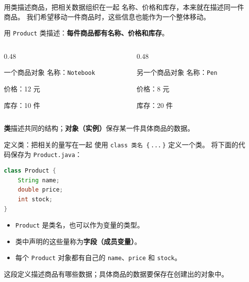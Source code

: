 \documentclass[aspectratio=169]{beamer}
\begin{document}
\begin{frame}{用类描述商品，把相关数据组织在一起}
  名称、价格和库存，本来就在描述同一件商品。
  我们希望移动一件商品时，这些信息也能\alert{作为一个整体}移动。
  \par\bigskip
  用 \texttt{Product} 类描述：\textbf{每件商品都有名称、价格和库存}。
  \par\medskip
  \begin{columns}[T,onlytextwidth]
    \begin{column}{0.48\textwidth}
      \begin{block}{一个商品对象}
        名称：\texttt{Notebook}\par
        价格：12 元\par
        库存：10 件
      \end{block}
    \end{column}
    \begin{column}{0.48\textwidth}
      \begin{block}{另一个商品对象}
        名称：\texttt{Pen}\par
        价格：8 元\par
        库存：20 件
      \end{block}
    \end{column}
  \end{columns}
  \bigskip
  \textbf{类}描述共同的结构；\textbf{对象（实例）}保存某一件具体商品的数据。
\end{frame}

\begin{frame}[fragile]{定义类：把相关的量写在一起}
  使用 \texttt{class 类名 \{}\,\texttt{...}\,\texttt{\}} 定义一个类。
  将下面的代码保存为 \texttt{Product.java}：
  \begin{lstlisting}[language=Java]
class Product {
    String name;
    double price;
    int stock;
}
  \end{lstlisting}
  \begin{itemize}
    \item \texttt{Product} 是类名，也可以作为变量的类型。
    \item 类中声明的这些量称为\textbf{字段（成员变量）}。
    \item 每个 \texttt{Product} 对象都有自己的 \texttt{name}、\texttt{price} 和 \texttt{stock}。
  \end{itemize}
  \medskip
  这段定义描述商品有哪些数据；具体商品的数据要保存在创建出的\alert{对象}中。
\end{frame}
\end{document}
